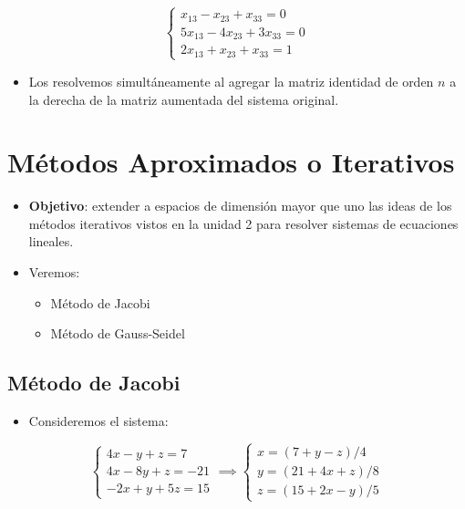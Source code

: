 \documentclass[openany]{book}
\providecommand{\tightlist}{%
  \setlength{\itemsep}{0pt}\setlength{\parskip}{0pt}}
\begin{document}
\[
\begin{cases} 
x_{13}-x_{23}+x_{33}=0 \\
5x_{13}-4x_{23}+3x_{33}=0 \\
2x_{13}+x_{23}+x_{33}=1
\end{cases}
\]

\begin{itemize}
\tightlist
\item
  Los resolvemos simultáneamente al agregar la matriz identidad de orden \(n\) a la derecha de la matriz aumentada del sistema original.
\end{itemize}

\hypertarget{muxe9todos-aproximados-o-iterativos}{%
\section{Métodos Aproximados o Iterativos}\label{muxe9todos-aproximados-o-iterativos}}

\begin{itemize}
\item
  \textbf{Objetivo}: extender a espacios de dimensión mayor que uno las ideas de los métodos iterativos vistos en la unidad 2 para resolver sistemas de ecuaciones lineales.
\item
  Veremos:

  \begin{itemize}
  \tightlist
  \item
    Método de Jacobi
  \item
    Método de Gauss-Seidel
  \end{itemize}
\end{itemize}

\hypertarget{muxe9todo-de-jacobi}{%
\subsection{Método de Jacobi}\label{muxe9todo-de-jacobi}}

\begin{itemize}
\tightlist
\item
  Consideremos el sistema:
\end{itemize}

\[
\begin{cases} 
4x-y+z=7 \\
4x-8y+z=-21 \\
-2x+y+5z=15
\end{cases}
\implies
\begin{cases} 
x=(7+y-z)/4 \\
y=(21+4x+z)/8 \\
z=(15+2x-y)/5
\end{cases}
\]
\end{document}
